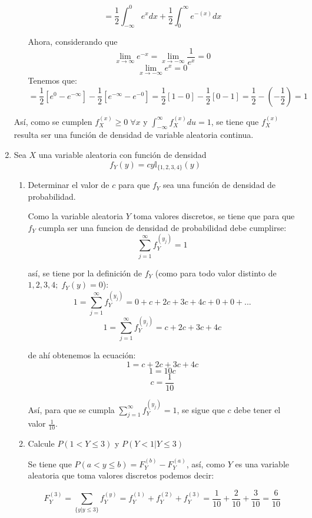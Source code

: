 \documentclass[12pt,a4paper]{report}
\begin{document}
\begin{enumerate}
\begin{enumerate}
{					$$ = \frac{1}{2} \int_{-\infty}^{0} e^{x} dx +
					     \frac{1}{2} \int_{0}^{\infty} e^{-(x)} dx $$

				 	Ahora, considerando que
	 					$$\lim_{x\to \infty}  e^{-x} = \lim_{x\to -\infty} \frac{1}{e^x} = 0$$
	 					$$\lim_{x\to -\infty}  e^x = 0$$
					Tenemos que:
					$$ = \frac{1}{2} [e^0 - e^{-\infty}] -
					     \frac{1}{2} [e^{-{\infty}} - e^{-0}]
					   = \frac{1}{2} [1 - 0] -
   					     \frac{1}{2} [0 - 1] = \frac{1}{2} - (- \frac{1}{2}) = 1 $$
				}
			\end{enumerate}

			Así, como se cumplen $f_X^{(x)} \geq 0 \; \forall x$ y
			$\int_{-\infty}^{\infty} f_X^{(x)} du = 1$, se tiene que $f_X^{(x)}$
			resulta ser una función de densidad de variable aleatoria continua.


		\item {
			Sea $X$ una variable aleatoria con función de densidad
				\[f_Y(y) = cy \mathbb{I}_{\{1, 2, 3, 4\}}(y)\]
				\begin{enumerate}
					\item {
						Determinar el valor de $c$ para que $f_Y$ sea una función de
						densidad de probabilidad.

						Como la variable aleatoria $Y$ toma valores discretos,
						se tiene que para que $f_Y$ cumpla ser una funcion de
						densidad de probabilidad debe cumplirse:
							$$ \sum_{j = 1}^{\infty} f_Y^{(y_j)} = 1 $$

						así, se tiene por la definición de $f_Y$ (como para todo
						valor distinto de $1, 2, 3, 4; \; f_Y(y) = 0$):
							$$ 1 = \sum_{j = 1}^{\infty} f_Y^{(y_j)} = 0 + c + 2c + 3c + 4c + 0 + 0 + ... $$
							$$ 1 = \sum_{j = 1}^{\infty} f_Y^{(y_j)} = c + 2c + 3c + 4c $$

						de ahí obtenemos la ecuación:
							$$ 1 = c + 2c + 3c + 4c $$
							$$ 1 = 10c $$
							$$ c = \frac{1}{10} $$

						Así, para que se cumpla $ \sum_{j = 1}^{\infty} f_Y^{(y_j)} = 1 $,
						se sigue que $c$ debe tener el valor $\frac{1}{10}$.
					}
					\item {
						Calcule $P(1 < Y \leq 3)$ y $P(Y < 1 | Y \leq 3)$

						Se tiene que $P(a < y \leq b) = F_Y^{(b)} - F_Y^{(a)}$,
						así, como $Y$ es una variable aleatoria que toma valores
						discretos podemos decir:

						$$ F_Y^{(3)} = \sum_{\{y | y \leq 3 \}} f_Y^{(y)}
						 = f_Y^{(1)} + f_Y^{(2)} + f_Y^{(3)}
						 = \frac{1}{10} + \frac{2}{10} + \frac{3}{10}
						 = \frac{6}{10}$$

}
\end{enumerate}}
\end{enumerate}
\end{document}
